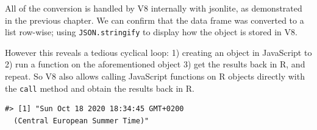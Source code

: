 \documentclass[
  10pt,
]{krantz}
\makeatletter
\newenvironment{Shaded}{\begin{snugshade}}{\end{snugshade}}
\newcommand{\CommentTok}[1]{\textcolor[rgb]{0.37,0.37,0.37}{\textit{#1}}}
\newcommand{\DecValTok}[1]{\textcolor[rgb]{0.06,0.06,0.06}{#1}}
\newcommand{\KeywordTok}[1]{\textcolor[rgb]{0.27,0.27,0.27}{\textbf{#1}}}
\newcommand{\NormalTok}[1]{#1}
\newcommand{\OperatorTok}[1]{\textcolor[rgb]{0.43,0.43,0.43}{\textbf{#1}}}
\newcommand{\StringTok}[1]{\textcolor[rgb]{0.5,0.5,0.5}{#1}}
\newenvironment{kframe}{%
\medskip{}
\setlength{\fboxsep}{.8em}
 \def\at@end@of@kframe{}%
 \ifinner\ifhmode%
  \def\at@end@of@kframe{\end{minipage}}%
  \begin{minipage}{\columnwidth}%
 \fi\fi%
 \def\FrameCommand##1{\hskip\@totalleftmargin \hskip-\fboxsep
 \colorbox{shadecolor}{##1}\hskip-\fboxsep
     \hskip-\linewidth \hskip-\@totalleftmargin \hskip\columnwidth}%
 \MakeFramed {\advance\hsize-\width
   \@totalleftmargin\z@ \linewidth\hsize
   \@setminipage}}%
 {\par\unskip\endMakeFramed%
 \at@end@of@kframe}
\renewenvironment{Shaded}{\begin{kframe}}{\end{kframe}}
\makeatother
\begin{document}
\begin{Shaded}
\end{Shaded}

All of the conversion is handled by V8 internally with jsonlite, as demonstrated in the previous chapter. We can confirm that the data frame was converted to a list row-wise; using \texttt{JSON.stringify} to display how the object is stored in V8.

\begin{Shaded}
\end{Shaded}

However this reveals a tedious cyclical loop: 1) creating an object in JavaScript to 2) run a function on the aforementioned object 3) get the results back in R, and repeat. So V8 also allows calling JavaScript functions on R objects directly with the \texttt{call} method and obtain the results back in R.

\begin{Shaded}
\end{Shaded}

\begin{verbatim}
#> [1] "Sun Oct 18 2020 18:34:45 GMT+0200 
  (Central European Summer Time)"
\end{verbatim}
\end{document}
